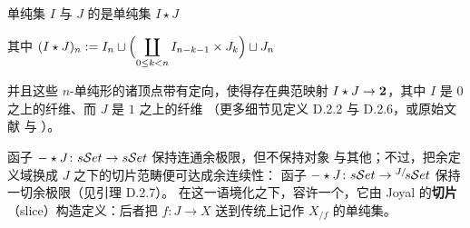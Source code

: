 \begin{definition}[\trJoin，D.2.6]\label{def:join}
单纯集 $I$ 与 $J$ 的\textbf{\trJoin}是单纯集 $I\star J$
\begin{center}
\qquad
其中 $\displaystyle(I\star J)_{n}:=I_{n}\sqcup\Bigl(\coprod_{0\leq k<n}I_{n-k-1}\times J_{k}\Bigr)\sqcup J_{n}$
\end{center}
并且这些 $n$-单纯形的诸顶点带有定向，使得存在典范映射
$I\star J\to\mathbf{2}$，其中 $I$ 是 $0$ 之上的纤维、而 $J$ 是 $1$ 之上的纤维
（更多细节见定义 D.2.2 与 D.2.6，或原始文献 \cite{bib40} 与
\cite[\S3]{bib61}）。
\end{definition}

\trJoin{}函子 $-\star J\colon s\mathcal{S}et\to s\mathcal{S}et$ 保持连通余极限，但不保持\trInitial{}对象
与其他\trCoproduct；不过，把余定义域换成 $J$ 之下的切片范畴便可达成余连续性：
函子 $-\star J\colon s\mathcal{S}et\to{}^{J/}\!s\mathcal{S}et$ 保持一切余极限（见引理 D.2.7）。
在这一语境化之下，\trJoin{}容许一个\trRightAdjoint，它由 Joyal 的\textbf{切片}%
（slice）构造定义：后者把\trSimplicialMap{} $f\colon J\to X$ 送到传统上记作 $X_{/f}$
的单纯集。

